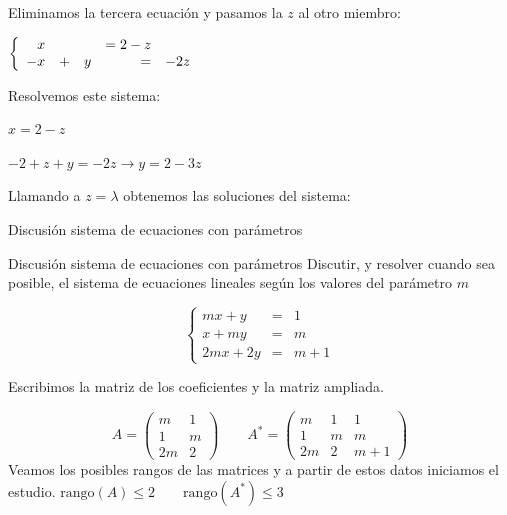 \documentclass[9pt]{beamer}
\newenvironment{sistematres}{\left\lbrace \begin{array}{rrrrrrr}}{\end{array} \right.}
\begin{document}
\begin{frame}
Eliminamos la tercera ecuación y pasamos la $z$ al otro miembro:

$\begin{sistematres}
x&&&=2-z \\
-x&+&y&=&-2z
\end{sistematres} $

Resolvemos este sistema:

$x=2-z$

$-2+z+y=-2z \rightarrow y=2-3z$

Llamando a $z=\lambda$ obtenemos las soluciones del sistema:


\end{frame}

\begin{frame}{Discusión sistema de ecuaciones con parámetros}
\begin{exampleblock}{Discusión sistema de ecuaciones con parámetros}
Discutir, y resolver cuando sea posible, el sistema de ecuaciones lineales según los valores del parámetro $m$

\[ \left\lbrace \begin{array}{rcl}
mx+y & = & 1 \\
x+my & = & m \\
2mx+2y & = & m+1
\end{array} \right. \]
\end{exampleblock}
\pause

Escribimos la matriz de los coeficientes y la matriz ampliada.

\[ A=\begin{pmatrix}
m & 1 \\
1 & m \\
2m & 2
\end{pmatrix} \qquad A^*=\begin{pmatrix}
m & 1 & 1 \\
1 & m & m \\
2m & 2 & m+1
\end{pmatrix} \]
\pause
Veamos los posibles rangos de las matrices y a partir de estos datos iniciamos el estudio.
$\text{rango} (A) \leq 2 \qquad \text{rango} (A^*) \leq 3 $
\pause
\end{frame}
\end{document}
